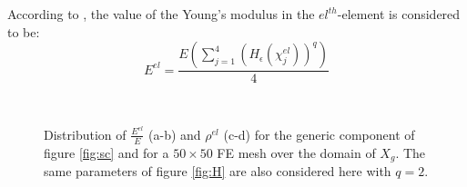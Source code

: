 According to \cite{guo2005new}, the value of the Young's modulus in the $el^{th}$-element is considered to be:
\begin{equation}
\label{eq:EMMC}
    E^{el}=\frac{E\left(\sum_{j=1}^4(H_{\epsilon}(\chi_j^{el}))^q\right)}{4}
\end{equation}
\begin{figure}[!ht]
\centering
    \quad
    \\
     \quad
    \caption{Distribution of $\frac{ E^{el}}{E}$ (a-b) and $ \rho^{el}$ (c-d)  for the generic component of figure \ref{fig:sc} and for a $50\times50$ FE mesh over the domain of $X_g$. The same parameters of figure \ref{fig:H} are also considered here with $q=2$. }%
\end{figure}
